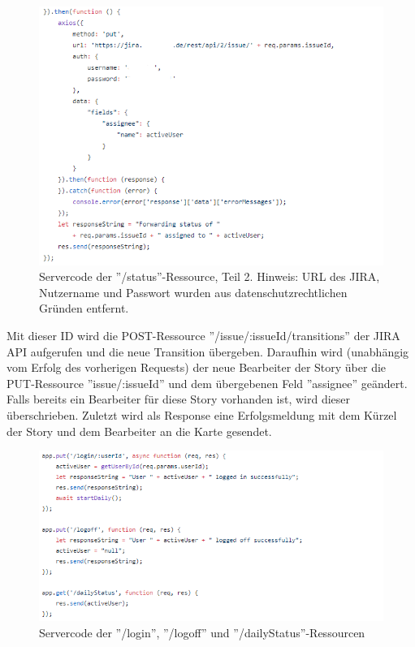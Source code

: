 \documentclass[12pt,titlepage]{scrartcl}
\begin{document}
			\begin{figure}[H] 
  				\centering
    			\includegraphics[height=0.5\textheight]{serverStatus2}
  				\caption{Servercode der ''/status''-Ressource, Teil 2. Hinweis: URL des JIRA, Nutzername und Passwort wurden aus datenschutzrechtlichen Gründen entfernt.}
  				\label{fig:serverStatus2}
			\end{figure}
			\noindent Mit dieser ID wird die POST-Ressource ''/issue/:issueId/transitions'' der JIRA API aufgerufen und die neue Transition übergeben. Daraufhin wird (unabhängig vom Erfolg des vorherigen Requests) der neue Bearbeiter der Story über die PUT-Ressource ''issue/:issueId'' und dem übergebenen Feld ''assignee'' geändert. Falls bereits ein Bearbeiter für diese Story vorhanden ist, wird dieser überschrieben. Zuletzt wird als Response eine Erfolgsmeldung mit dem Kürzel der Story und dem Bearbeiter an die Karte gesendet. 
			\begin{figure}[H] 
  				\centering
    			\includegraphics[height=0.4\textheight]{serverLoginLogoff}
  				\caption{Servercode der ''/login'', ''/logoff'' und ''/dailyStatus''-Ressourcen}
  				\label{fig:serverLoginLogoff}
			\end{figure}
\end{document}
